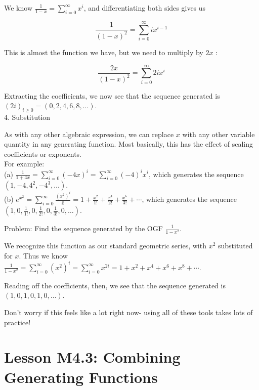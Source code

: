 \documentclass{article}
\begin{document}
We know $\frac{1}{1-x}=\sum_{i=0}^{\infty} x^{i}$, and differentiating both sides gives us

$$
\frac{1}{(1-x)^{2}}=\sum_{i=0}^{\infty} i x^{i-1}
$$

This is almost the function we have, but we need to multiply by $2 x$ :

$$
\frac{2 x}{(1-x)^{2}}=\sum_{i=0}^{\infty} 2 i x^{i}
$$

Extracting the coefficients, we now see that the sequence generated is $(2 i)_{i \geq 0}=(0,2,4,6,8, \ldots)$.\\
4. Substitution

As with any other algebraic expression, we can replace $x$ with any other variable quantity in any generating function. Most basically, this has the effect of scaling coefficients or exponents.\\
For example:\\
(a) $\frac{1}{1+4 x}=\sum_{i=0}^{\infty}(-4 x)^{i}=\sum_{i=0}^{\infty}(-4)^{i} x^{i}$, which generates the sequence $\left(1,-4,4^{2},-4^{3}, \ldots\right)$.\\
(b) $e^{x^{2}}=\sum_{i=0}^{\infty} \frac{\left(x^{2}\right)^{i}}{i!}=1+\frac{x^{2}}{1!}+\frac{x^{4}}{2!}+\frac{x^{6}}{3!}+\cdots$, which generates the sequence $\left(1,0, \frac{1}{1!}, 0, \frac{1}{2!}, 0, \frac{1}{3!}, 0, \ldots\right)$.

Problem: Find the sequence generated by the OGF $\frac{1}{1-x^{2}}$.

We recognize this function as our standard geometric series, with $x^{2}$ substituted for $x$. Thus we know $\frac{1}{1-x^{2}}=\sum_{i=0}^{\infty}\left(x^{2}\right)^{i}=\sum_{i=0}^{\infty} x^{2 i}=1+x^{2}+x^{4}+x^{6}+x^{8}+\cdots$.

Reading off the coefficients, then, we see that the sequence generated is $(1,0,1,0,1,0, \ldots)$.

Don't worry if this feels like a lot right now- using all of these tools takes lots of practice!











\newpage



\section*{Lesson M4.3: Combining Generating Functions}
\end{document}
